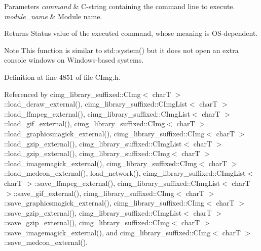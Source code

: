 \begin{DoxyParams}{Parameters}
{\em command} & C-\/string containing the command line to execute. \\
\hline
{\em module\+\_\+name} & Module name. \\
\hline
\end{DoxyParams}
\begin{DoxyReturn}{Returns}
Status value of the executed command, whose meaning is O\+S-\/dependent. 
\end{DoxyReturn}
\begin{DoxyNote}{Note}
This function is similar to {\ttfamily std\+::system()} but it does not open an extra console windows on Windows-\/based systems. 
\end{DoxyNote}


Definition at line 4851 of file C\+Img.\+h.



Referenced by cimg\+\_\+library\+\_\+suffixed\+::\+C\+Img$<$ char\+T $>$\+::load\+\_\+dcraw\+\_\+external(), cimg\+\_\+library\+\_\+suffixed\+::\+C\+Img\+List$<$ char\+T $>$\+::load\+\_\+ffmpeg\+\_\+external(), cimg\+\_\+library\+\_\+suffixed\+::\+C\+Img\+List$<$ char\+T $>$\+::load\+\_\+gif\+\_\+external(), cimg\+\_\+library\+\_\+suffixed\+::\+C\+Img$<$ char\+T $>$\+::load\+\_\+graphicsmagick\+\_\+external(), cimg\+\_\+library\+\_\+suffixed\+::\+C\+Img$<$ char\+T $>$\+::load\+\_\+gzip\+\_\+external(), cimg\+\_\+library\+\_\+suffixed\+::\+C\+Img\+List$<$ char\+T $>$\+::load\+\_\+gzip\+\_\+external(), cimg\+\_\+library\+\_\+suffixed\+::\+C\+Img$<$ char\+T $>$\+::load\+\_\+imagemagick\+\_\+external(), cimg\+\_\+library\+\_\+suffixed\+::\+C\+Img$<$ char\+T $>$\+::load\+\_\+medcon\+\_\+external(), load\+\_\+network(), cimg\+\_\+library\+\_\+suffixed\+::\+C\+Img\+List$<$ char\+T $>$\+::save\+\_\+ffmpeg\+\_\+external(), cimg\+\_\+library\+\_\+suffixed\+::\+C\+Img\+List$<$ char\+T $>$\+::save\+\_\+gif\+\_\+external(), cimg\+\_\+library\+\_\+suffixed\+::\+C\+Img$<$ char\+T $>$\+::save\+\_\+graphicsmagick\+\_\+external(), cimg\+\_\+library\+\_\+suffixed\+::\+C\+Img$<$ char\+T $>$\+::save\+\_\+gzip\+\_\+external(), cimg\+\_\+library\+\_\+suffixed\+::\+C\+Img\+List$<$ char\+T $>$\+::save\+\_\+gzip\+\_\+external(), cimg\+\_\+library\+\_\+suffixed\+::\+C\+Img$<$ char\+T $>$\+::save\+\_\+imagemagick\+\_\+external(), and cimg\+\_\+library\+\_\+suffixed\+::\+C\+Img$<$ char\+T $>$\+::save\+\_\+medcon\+\_\+external().

